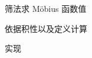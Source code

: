 \begin{frame}{筛法求 M{\"o}bius 函数值}
	\label{mulf:algo:mobius-seive}

	依据积性以及定义计算
\end{frame}


\begin{frame}{实现}
\end{frame}
